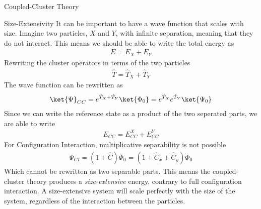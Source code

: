 \documentclass[twoside,english]{uiofysmaster}
\begin{document}
\begin{chapter}{Coupled-Cluster Theory}
  	\begin{section}{Size-Extensivity}
  		It can be important to have a wave function that scales with size. Imagine two particles, $X$ and $Y$, with infinite separation, meaning that they do not interact. This means we should be able to write the total energy as
  		\begin{align}
  			E = E_X + E_Y
  		\end{align}
  		Rewriting the cluster operators in terms of the two particles
  		\begin{align}
  			\hat T = \hat T_X + \hat T_Y 
  		\end{align}
  		The wave function can be rewritten as 
  		\begin{align}
  			\ket{\Psi}_{CC} = e^{\hat T_X + \hat T_Y} \ket{\Phi_0} = e^{\hat T_X} e^{\hat T_Y} \ket{\Psi_0}
  		\end{align}
  		Since we can write the reference state as a product of the two seperated parts, we are able to write
  		\begin{align}
  			E_{CC} = E_{CC}^X + E_{CC}^Y
  		\end{align}
  		For Configuration Interaction, multiplicative separability is not possible
  		\begin{align}
  			\Psi_{CI} = \left(1 + \hat C\right) \Phi_0 = \left( 1 + \hat C_x + \hat C_y \right) \Phi_0
  		\end{align}
  		Which cannot be rewritten as two separable parts. This means the coupled-cluster theory produces a \textit{size-extensive} energy, contrary to full configuration interaction. A size-extensive system will scale perfectly with the size of the system, regardless of the interaction between the particles.

  	\end{section}


\end{chapter}
\end{document}
